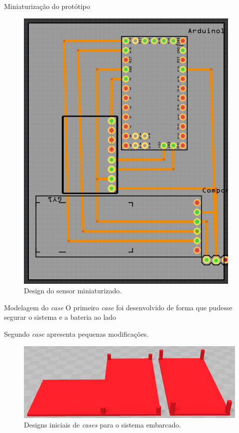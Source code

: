 \documentclass[12pt]{beamer}
\begin{document}
\begin{frame}{Miniaturização do protótipo}
   \begin{figure}[H]
    \centering
    \includegraphics[scale=.6, angle =90]{pcb.png}
    \caption{Design do sensor miniaturizado.}
    \label{fig:pcb}
    \end{figure} 
\end{frame}

\begin{frame}{Modelagem do \textit{case}}
    O primeiro \textit{case} foi desenvolvido de forma que pudesse segurar o sistema e a bateria ao lado
    
    Segundo \textit{case} apresenta pequenas modificações.
    \begin{figure}[H]
    \centering
    \includegraphics[width=\textwidth]{casesAnteriores.png}
    \caption{Designs iniciais de \textit{cases} para o sistema embarcado.}
    \label{fig:caseAnterior}
    \end{figure}
\end{frame}
\end{document}
